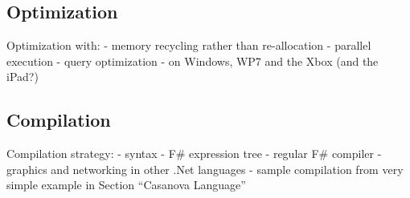 
\subsection{Optimization}
Optimization with:
- memory recycling rather than re-allocation
- parallel execution
- query optimization
- on Windows, WP7 and the Xbox (and the iPad?)

\subsection{Compilation}
Compilation strategy:
- syntax
- F\# expression tree
- regular F\# compiler
- graphics and networking in other .Net languages
- sample compilation from very simple example in Section ``Casanova Language''
